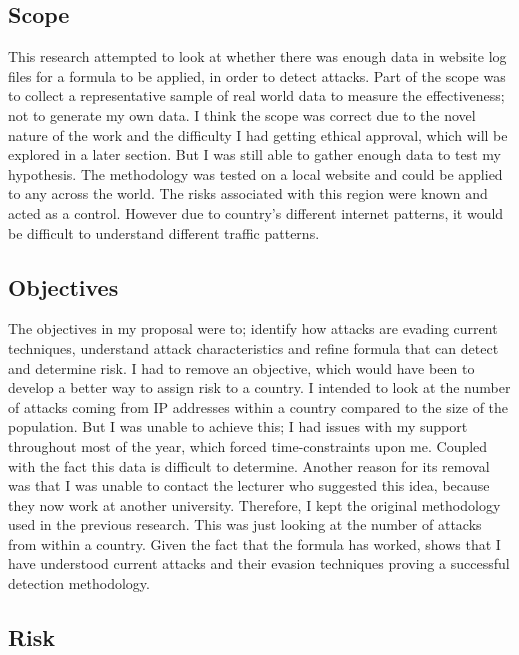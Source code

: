 \subsection{Scope}

This research attempted to look at whether there was enough data in website log files for a formula to be applied, in order to detect attacks. Part of the scope was to collect a representative sample of real world data to measure the effectiveness; not to generate my own data. I think the scope was correct due to the novel nature of the work and the difficulty I had getting ethical approval, which will be explored in a later section. But I was still able to gather enough data to test my hypothesis. The methodology was tested on a local website and could be applied to any across the world. The risks associated with this region were known and acted as a control. However due to country's different internet patterns, it would be difficult to understand different traffic patterns. 


\subsection{Objectives}

The objectives in my proposal were to; identify how attacks are evading current techniques, understand attack characteristics and refine formula that can detect and determine risk. I had to remove an objective, which would have been to develop a better way to assign risk to a country. I intended to look at the number of attacks coming from IP addresses within a country compared to the size of the population. But I was unable to achieve this; I had issues with my support throughout most of the year, which forced time-constraints upon me. Coupled with the fact this data is difficult to determine. Another reason for its removal was that I was unable to contact the lecturer who suggested this idea, because they now work at another university. Therefore, I kept the original methodology used in the previous research. This was just looking at the number of attacks from within a country. Given the fact that the formula has worked, shows that I have understood current attacks and their evasion techniques proving a successful detection methodology.

\subsection{Risk}

